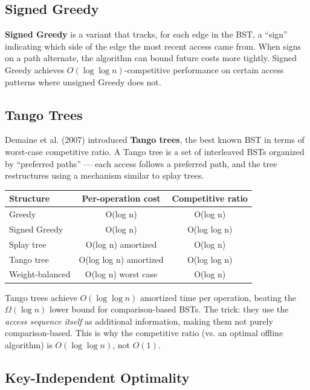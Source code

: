 \subsection{Signed Greedy}

\textbf{Signed Greedy} is a variant that tracks, for each edge in the BST, a ``sign'' indicating which side of the edge the most recent access came from. When signs on a path alternate, the algorithm can bound future costs more tightly. Signed Greedy achieves $O(\log \log n)$-competitive performance on certain access patterns where unsigned Greedy does not.

\subsection{Tango Trees}

Demaine et al. (2007) introduced \textbf{Tango trees}, the best known BST in terms of worst-case competitive ratio. A Tango tree is a set of interleaved BSTs organized by ``preferred paths'' --- each access follows a preferred path, and the tree restructures using a mechanism similar to splay trees.

\begin{center}
\begin{tabular}{lcc}
\toprule
Structure & Per-operation cost & Competitive ratio \\
\midrule
Greedy & O(log n) & O(log n) \\
Signed Greedy & O(log n) & O(log log n) \\
Splay tree & O(log n) amortized & O(log n) \\
Tango tree & O(log log n) amortized & O(log log n) \\
Weight-balanced & O(log n) worst case & O(log n) \\
\bottomrule
\end{tabular}
\end{center}

Tango trees achieve $O(\log \log n)$ amortized time per operation, beating the $\Omega(\log n)$ lower bound for comparison-based BSTs. The trick: they use the \textit{access sequence itself} as additional information, making them not purely comparison-based. This is why the competitive ratio (vs. an optimal offline algorithm) is $O(\log \log n)$, not $O(1)$.

\subsection{Key-Independent Optimality}

